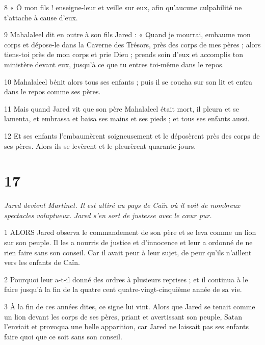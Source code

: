\par 8 « Ô mon fils ! enseigne-leur et veille sur eux, afin qu'aucune culpabilité ne t'attache à cause d'eux.

\par 9 Mahalaleel dit en outre à son fils Jared : « Quand je mourrai, embaume mon corps et dépose-le dans la Caverne des Trésors, près des corps de mes pères ; alors tiens-toi près de mon corps et prie Dieu ; prends soin d'eux et accomplis ton ministère devant eux, jusqu'à ce que tu entres toi-même dans le repos.

\par 10 Mahalaleel bénit alors tous ses enfants ; puis il se coucha sur son lit et entra dans le repos comme ses pères.

\par 11 Mais quand Jared vit que son père Mahalaleel était mort, il pleura et se lamenta, et embrassa et baisa ses mains et ses pieds ; et tous ses enfants aussi.

\par 12 Et ses enfants l'embaumèrent soigneusement et le déposèrent près des corps de ses pères. Alors ils se levèrent et le pleurèrent quarante jours.

\chapter{17}

\par \textit{Jared devient Martinet. Il est attiré au pays de Caïn où il voit de nombreux spectacles voluptueux. Jared s'en sort de justesse avec le cœur pur.}

\par 1 ALORS Jared observa le commandement de son père et se leva comme un lion sur son peuple. Il les a nourris de justice et d’innocence et leur a ordonné de ne rien faire sans son conseil. Car il avait peur à leur sujet, de peur qu'ils n'aillent vers les enfants de Caïn.

\par 2 Pourquoi leur a-t-il donné des ordres à plusieurs reprises ; et il continua à le faire jusqu'à la fin de la quatre cent quatre-vingt-cinquième année de sa vie.

\par 3 À la fin de ces années dites, ce signe lui vint. Alors que Jared se tenait comme un lion devant les corps de ses pères, priant et avertissant son peuple, Satan l'enviait et provoqua une belle apparition, car Jared ne laissait pas ses enfants faire quoi que ce soit sans son conseil.

